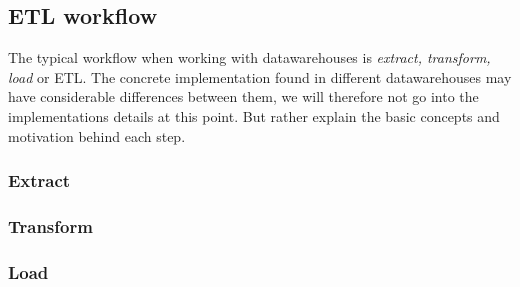 	\subsection{ETL workflow}
		The typical workflow when working with datawarehouses is \textit{extract, transform, load} or ETL. 
		The concrete implementation found in different datawarehouses may have considerable differences between them, 
		we will therefore not go into the implementations details at this point. But rather explain the basic concepts
		and motivation behind each step.
		
		\subsubsection{Extract}
			
		\subsubsection{Transform}
			
		\subsubsection{Load}
			